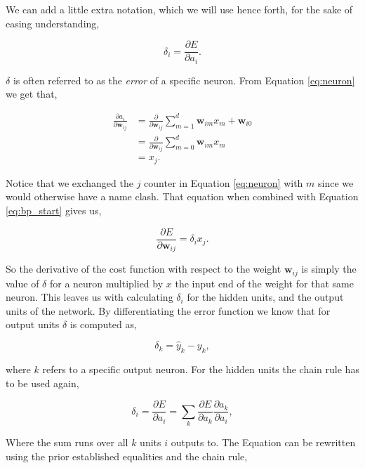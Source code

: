 We can add a little extra notation, which we will use hence forth, for the
sake of easing understanding,

\begin{equation}\label{eq:delta}
    \delta_i = \frac{\partial E}{\partial a_i}.
\end{equation}

$\delta$ is often referred to as the \textit{error} of a specific neuron.
From Equation \eqref{eq:neuron} we get that,

\begin{align}
    \frac{\partial a_i}{\partial \mathbf{w}_{ij}}
        &= \frac{\partial}{\partial \mathbf{w}_{ij}}
            \sum_{m=1}^d \mathbf{w}_{im} x_m + \mathbf{w}_{i0}\\
        &= \frac{\partial}{\partial \mathbf{w}_{ij}} \sum_{m = 0}^d
            \mathbf{w}_{im} x_m\\
        &= x_j.
\end{align}

Notice that we exchanged the $j$ counter in Equation \eqref{eq:neuron} with $m$
since we would otherwise have a name clash. That equation when combined with
Equation \eqref{eq:bp_start} gives us,

\begin{equation} \label{eq:deriv}
    \frac{\partial E}{\partial \mathbf{w}_{ij}} = \delta_i x_j.
\end{equation}

So the derivative of the cost function with respect to the weight
$\mathbf{w}_{ij}$ is simply the value of $\delta$ for a neuron multiplied by
$x$ the input end of the weight for that same neuron. This leaves us with
calculating $\delta_i$ for the hidden units, and the output units of the
network. By differentiating the error function we know that for output units
$\delta$ is computed as,

\begin{equation}
    \label{eq:output}
    \delta_k = \hat{y}_k - y_k,
\end{equation}

where $k$ refers to a specific output neuron. For the hidden units the chain
rule has to be used again,

\begin{equation}
    \label{eq:bp}
    \delta_i = \frac{\partial E}{\partial a_i} =
    \sum_k \frac{\partial E}{\partial a_k} \frac{\partial a_k}{\partial a_i},
\end{equation}

Where the sum runs over all $k$ units $i$ outputs to. The Equation can be
rewritten using the prior established equalities and the chain rule,


